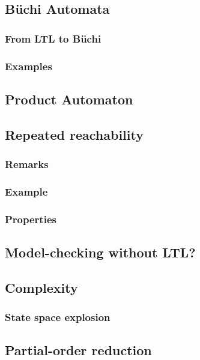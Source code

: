 \documentclass[12pt, a4paper]{book}
\begin{document}
  \subsection{Büchi Automata}
  \label{sub:Büchi Automata}
  \subsubsection{From LTL to Büchi}
  \label{subs:From LTL to Büchi}
  \subsubsection{Examples}
  \label{subs:Examples}
  \subsection{Product Automaton}
  \label{sub:Product Automaton}
  \subsection{Repeated reachability}
  \label{sub:Repeated reachability}
  \subsubsection{Remarks}
  \label{subs:Remarks}
  \subsubsection{Example}
  \label{subs:Example}
  \subsubsection{Properties}
  \label{subs:Properties}
  \subsection{Model-checking without LTL?}
  \label{sub:Model-checking without LTL?}
  \subsection{Complexity}
  \label{sub:Complexity}
  \subsubsection{State space explosion}
  \label{subs:State space explosion}
  \subsection{Partial-order reduction}
  \label{sub:Partial-order reduction}
\end{document}
